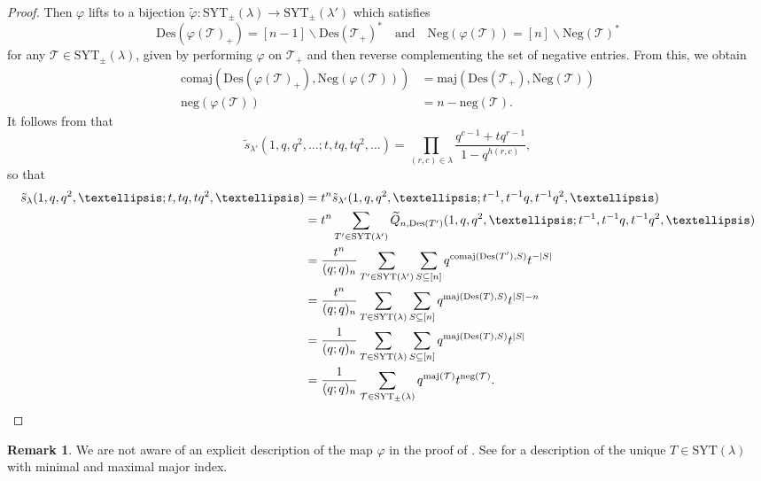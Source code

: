 \documentclass[11pt]{article}
\theoremstyle{definition}
\newtheorem{rema}[theo]{Remark}
\numberwithin{equation}{section}
\newcommand\comaj{\mathrm{comaj}}
\newcommand\Des{\mathrm{Des}}
\newcommand\maj{\mathrm{maj}}
\newcommand\Neg{\mathrm{Neg}}
\newcommand\negg{\mathrm{neg}}
\newcommand\SYT{\mathrm{SYT}}
\newcommand\Qtil{\widetilde{Q}}
\newcommand\stil{\tilde{s}}
\begin{document}
\begin{proof}
    Then $\varphi$ lifts to a bijection $\widetilde{\varphi} : \SYT_\pm(\lambda) \to \SYT_\pm(\lambda')$ which satisfies
    \[
    \Des(\varphi(\mathcal{T})_+) = [n-1] \backslash \Des(\mathcal{T}_+)^* \quad \text{and} \quad \Neg(\varphi(\mathcal{T})) = [n] \backslash \Neg(\mathcal{T})^*
    \]
    for any $\mathcal{T} \in \SYT_\pm(\lambda)$, given by performing $\varphi$ on $\mathcal{T}_+$ and then reverse complementing the set of negative entries. From this, we obtain
    \begin{align*}
    \comaj(\Des(\varphi(\mathcal{T})_+),\Neg(\varphi(\mathcal{T})))
    &= \maj(\Des(\mathcal{T}_+),\Neg(\mathcal{T})) \\
    \negg(\varphi(\mathcal{T}))
    &= n - \negg(\mathcal{T}).
    \end{align*}
    It follows from  that
    \[
        \stil_{\lambda'}(1,q,q^2,\ldots;t,tq,tq^2,\ldots) = \prod_{(r,c) \in \lambda} \frac{q^{c-1} + tq^{r-1}}{1-q^{h(r,c)}},
    \]
    so that
    \begin{align*}
        \stil_\lambda(1,q,q^2,\ldots;t,tq,tq^2,\ldots) &= t^n\stil_{\lambda'}(1,q,q^2,\ldots;t^{-1},t^{-1}q,t^{-1}q^2,\ldots) \\
        &= t^n \sum_{T' \in \SYT(\lambda')} \Qtil_{n,\Des(T')}(1,q,q^2,\ldots;t^{-1},t^{-1}q,t^{-1}q^2,\ldots) \\
        &= \frac{t^n}{(q;q)_n} \sum_{T' \in \SYT(\lambda')} \sum_{S \subseteq [n]} q^{\comaj(\Des(T'),S)} t^{-|S|} \\
        &= \frac{t^n}{(q;q)_n} \sum_{T \in \SYT(\lambda)} \sum_{S \subseteq [n]} q^{\maj(\Des(T),S)} t^{|S|-n} \\
        &= \frac{1}{(q;q)_n} \sum_{T \in \SYT(\lambda)} \sum_{S \subseteq [n]} q^{\maj(\Des(T),S)} t^{|S|} \\
        &= \frac{1}{(q;q)_n} \sum_{\mathcal{T} \in \SYT_\pm(\lambda)} q^{\maj(\mathcal{T})}t^{\negg(\mathcal{T})}. \qedhere
    \end{align*}
\end{proof}

\begin{rema}
    We are not aware of an explicit description of the map $\varphi$ in the proof of . See \cite[\S4]{BKS} for a description of the unique $T \in \SYT(\lambda)$ with minimal and maximal major index.
\end{rema}
\end{document}
